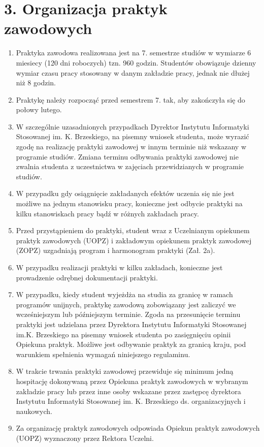 \documentclass[12pt,a4paper]{article}
\begin{document}
\section*{3. Organizacja praktyk zawodowych}
\begin{enumerate}
    \item Praktyka zawodowa realizowana jest na 7. semestrze studiów w wymiarze 6 miesiecy (120 dni roboczych) tzn. 960 godzin. Studentów obowiązuje dzienny wymiar czasu pracy stosowany w danym zakładzie pracy, jednak nie dłużej niż 8 godzin.
    \item Praktykę należy rozpocząć przed semestrem 7. tak, aby zakończyła się do połowy lutego.
    \item W szczególnie uzasadnionych przypadkach Dyrektor Instytutu Informatyki Stosowanej im. K. Brzeskiego, na pisemny wniosek studenta, może wyrazić zgodę na realizację praktyki zawodowej w innym terminie niż wskazany w programie studiów. Zmiana terminu odbywania praktyki zawodowej nie zwalnia studenta z uczestnictwa w zajęciach przewidzianych w programie studiów.
    \item W przypadku gdy osiągnięcie zakładanych efektów uczenia się nie jest możliwe na jednym stanowisku pracy, konieczne jest odbycie praktyki na kilku stanowiskach pracy bądź w różnych zakładach pracy.
    \item Przed przystąpieniem do praktyki, student wraz z Uczelnianym opiekunem praktyk zawodowych (UOPZ) i zakładowym opiekunem praktyk zawodowej (ZOPZ) uzgadniają program i harmonogram praktyki (Zał. 2a).
    \item W przypadku realizacji praktyki w kilku zakładach, konieczne jest prowadzenie odrębnej dokumentacji praktyki.
    \item W przypadku, kiedy student wyjeżdża na studia za granicę w ramach programów unijnych, praktykę zawodową zobowiązany jest zaliczyć we wcześniejszym lub późniejszym terminie. Zgoda na przesunięcie terminu praktyki jest udzielana przez Dyrektora Instytutu Informatyki Stosowanej im.K. Brzeskiego na pisemny wniosek studenta po zasięgnięciu opinii Opiekuna praktyk. Możliwe jest odbywanie praktyk za granicą kraju, pod warunkiem spełnienia wymagań niniejszego regulaminu.
    \item W trakcie trwania praktyki zawodowej przewiduje się minimum jedną hospitację dokonywaną przez Opiekuna praktyk zawodowych w wybranym zakładzie pracy lub przez inne osoby wskazane przez zastępcę dyrektora Instytutu Informatyki Stosowanej im. K. Brzeskiego ds. organizacyjnych i naukowych.
    \item Za organizację praktyk zawodowych odpowiada Opiekun praktyk zawodowych (UOPZ) wyznaczony przez Rektora Uczelni.
\end{enumerate}
\end{document}
